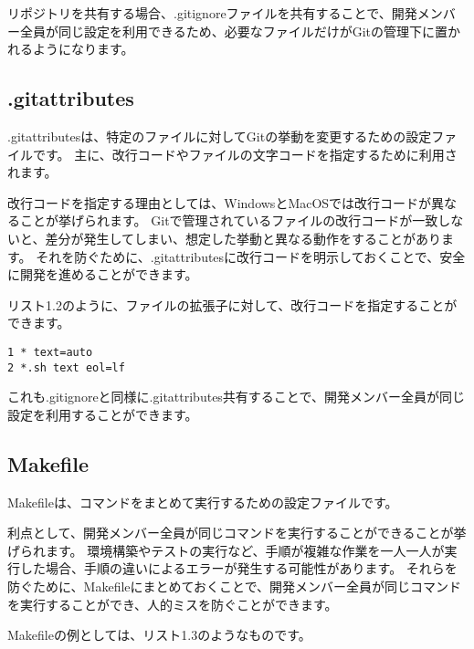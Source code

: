 リポジトリを共有する場合、.gitignoreファイルを共有することで、開発メンバー全員が同じ設定を利用できるため、必要なファイルだけがGitの管理下に置かれるようになります。

\subsection{.gitattributes}

.gitattributesは、特定のファイルに対してGitの挙動を変更するための設定ファイルです。
主に、改行コードやファイルの文字コードを指定するために利用されます。

改行コードを指定する理由としては、WindowsとMacOSでは改行コードが異なることが挙げられます。
Gitで管理されているファイルの改行コードが一致しないと、差分が発生してしまい、想定した挙動と異なる動作をすることがあります。
それを防ぐために、.gitattributesに改行コードを明示しておくことで、安全に開発を進めることができます。

リスト1.2のように、ファイルの拡張子に対して、改行コードを指定することができます。

\begin{tcolorbox}[title=リスト1.2 .gitattributes]
  \begin{verbatim}
1 * text=auto
2 *.sh text eol=lf
\end{verbatim}
\end{tcolorbox}

これも.gitignoreと同様に.gitattributes共有することで、開発メンバー全員が同じ設定を利用することができます。


\subsection{Makefile}

Makefileは、コマンドをまとめて実行するための設定ファイルです。

利点として、開発メンバー全員が同じコマンドを実行することができることが挙げられます。
環境構築やテストの実行など、手順が複雑な作業を一人一人が実行した場合、手順の違いによるエラーが発生する可能性があります。
それらを防ぐために、Makefileにまとめておくことで、開発メンバー全員が同じコマンドを実行することができ、人的ミスを防ぐことができます。

Makefileの例としては、リスト1.3のようなものです。

